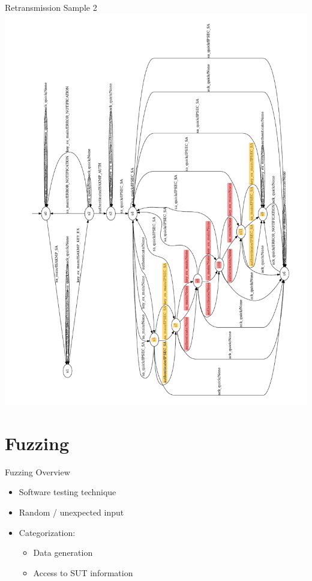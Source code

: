 \documentclass[aspectratio=169, xcolor=table]{beamer}
\begin{document}
	\begin{frame}{Retransmission Sample 2}
		\vspace{-2.7em}
		\centering
		\includegraphics[height=1.2\textheight, angle=270, trim={4em 0 0 0},clip]{models/retransmissions/retrans_case2_lstar}
	\end{frame}
\fi
\section{Fuzzing}

\begin{frame}{Fuzzing Overview}
	\vspace{-1.5em}
	\begin{itemize}
		\item Software testing technique
		\pause
		\item Random / unexpected input
		\pause
		\item Categorization:
			\begin{itemize}
				\item Data generation
				\pause
				\item Access to SUT information
			\end{itemize}
	\end{itemize}
\end{frame}
\end{document}
